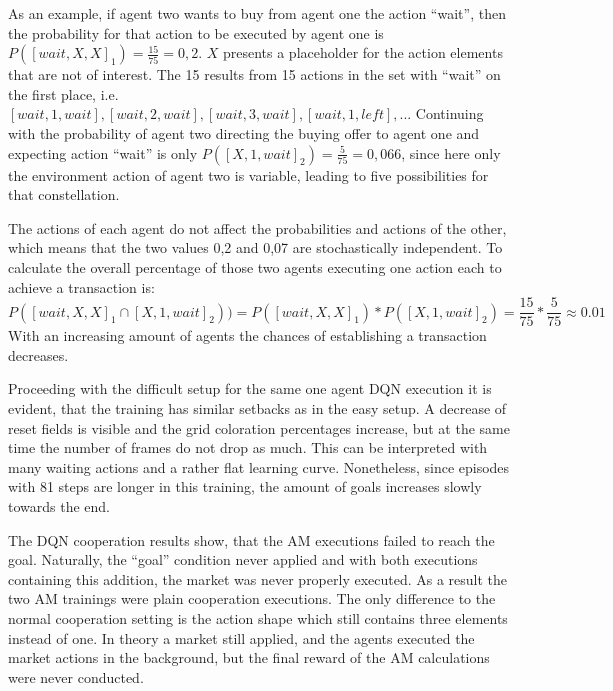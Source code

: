 As an example, if agent two wants to buy from agent one the action ``wait'', then the probability for that action to be executed by agent one is $P([wait,X,X]_1) = \frac{15}{75}=0,2$. $X$ presents a placeholder for the action elements that are not of interest. The 15 results from 15 actions in the set with ``wait'' on the first place, i.e. $[wait,1,wait], [wait,2,wait], [wait,3,wait], [wait,1,left],$... Continuing with the probability of agent two directing the buying offer to agent one and expecting action ``wait'' is only $P([X,1,wait]_2)=\frac{5}{75}=0,066$, since here only the environment action of agent two is variable, leading to five possibilities for that constellation. 

The actions of each agent do not affect the probabilities and actions of the other, which means that the two values 0,2 and 0,07 are stochastically independent. To calculate the overall percentage of those two agents executing one action each to achieve a transaction is:
\begin{equation}\label{eq:TRPO}
    P([wait,X,X]_1 \cap [X,1,wait]_2))=P([wait,X,X]_1) * P([X,1,wait]_2) = \frac{15}{75}*\frac{5}{75} \approx 0.01
\end{equation}
With an increasing amount of agents the chances of establishing a transaction decreases.

Proceeding with the difficult setup for the same one agent DQN execution it is evident, that the training has similar setbacks as in the easy setup. A decrease of reset fields is visible and the grid coloration percentages increase, but at the same time the number of frames do not drop as much. This can be interpreted with many waiting actions and a rather flat learning curve. Nonetheless, since episodes with 81 steps are longer in this training, the amount of goals increases slowly towards the end.

The DQN cooperation results show, that the AM executions failed to reach the goal. Naturally, the ``goal'' condition never applied and with both executions containing this addition, the market was never properly executed. As a result the two AM trainings were plain cooperation executions. The only difference to the normal cooperation setting is the action shape which still contains three elements instead of one. In theory a market still applied, and the agents executed the market actions in the background, but the final reward of the AM calculations were never conducted. 

